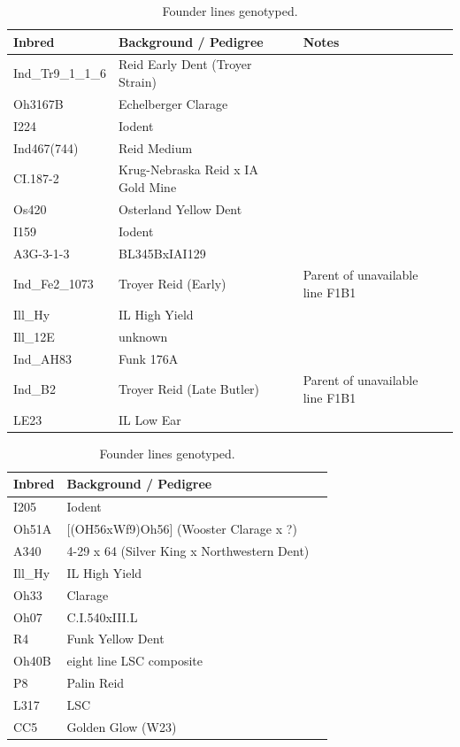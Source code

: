 \begin{table}
\caption{Founder lines genotyped. } %
	\begin{tabular}{ lllll }
	Inbred & Background / Pedigree &  & Notes \\ \hline
	Ind\_Tr9\_1\_1\_6 & Reid Early Dent (Troyer Strain) &  &  \\ 
	Oh3167B & Echelberger Clarage &  &  \\ 
	I224 & Iodent &  &  \\ 
	Ind467(744) & Reid Medium &  &  \\ 
	CI.187-2 & Krug-Nebraska Reid x IA Gold Mine &  &  \\ 
	Os420 & Osterland Yellow Dent &  &  \\ 
	I159 & Iodent &  &  \\ 
	A3G-3-1-3 & BL345BxIAI129 &  &  \\ 
	Ind\_Fe2\_1073 & Troyer Reid (Early) &  & Parent of unavailable line F1B1 \\ 
	Ill\_Hy & IL High Yield &  &  \\ 
	Ill\_12E & unknown &  &  \\ 
	Ind\_AH83 & Funk 176A &  &  \\ 
	Ind\_B2 & Troyer Reid (Late Butler) &  & Parent of unavailable line F1B1 \\ 
	LE23 & IL Low Ear &  &  \\ \hline
	\end{tabular} 
	\bigskip
	
	\begin{tabular}{lll}
	Inbred & Background / Pedigree \\ \hline
	I205 & Iodent &  &  \\ 
	Oh51A & [(OH56xWf9)Oh56] (Wooster Clarage x ?)   \\ 
	A340 & 4-29 x 64 (Silver King x Northwestern Dent)   \\ 
	Ill\_Hy & IL High Yield   \\ 
	Oh33 & Clarage  \\ 
	Oh07 & C.I.540xIII.L  \\ 
	R4 & Funk Yellow Dent   \\ 
	Oh40B & eight line LSC composite  \\ 
	P8 & Palin Reid   \\ 
	L317 & LSC   \\ 
	CC5 & Golden Glow (W23)  \\ 
	\end{tabular}
	

\end{table}
